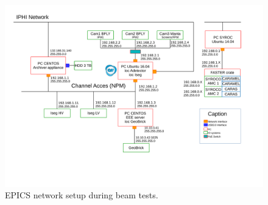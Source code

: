 \begin{figure}[!ht]
	\begin{center}
		\includegraphics[width=\textwidth]{04_IPHI_Test/figures/fig000_EPICS_IPHI.pdf}
	\end{center}
	\caption[EPICS network setup during beam tests]{EPICS network setup during beam tests.}
	\label{chap4:EPICS_IPHI}
\end{figure}
